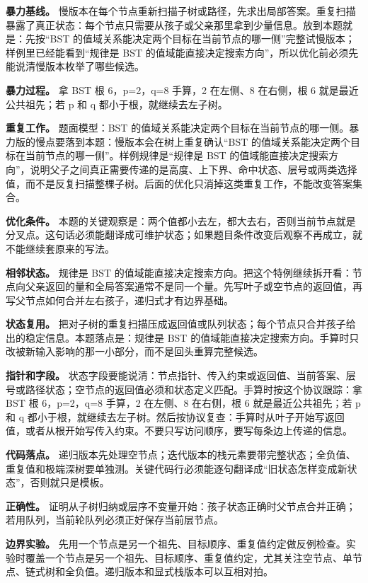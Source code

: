 \textbf{暴力基线。} 慢版本在每个节点重新扫描子树或路径，先求出局部答案。重复扫描暴露了真正状态：每个节点只需要从孩子或父亲那里拿到少量信息。放到本题就是：先按“BST 的值域关系能决定两个目标在当前节点的哪一侧”完整试慢版本；样例里已经能看到“规律是 BST 的值域能直接决定搜索方向”，所以优化前必须先能说清慢版本枚举了哪些候选。

\textbf{暴力过程。} 拿 BST 根 6，p=2，q=8 手算，2 在左侧、8 在右侧，根 6 就是最近公共祖先；若 p 和 q 都小于根，就继续去左子树。

\textbf{重复工作。} 题面模型：BST 的值域关系能决定两个目标在当前节点的哪一侧。暴力版的慢点要落到本题：慢版本会在树上重复确认“BST 的值域关系能决定两个目标在当前节点的哪一侧”。样例规律是“规律是 BST 的值域能直接决定搜索方向”，说明父子之间真正需要传递的是高度、上下界、命中状态、层号或两类选择值，而不是反复扫描整棵子树。后面的优化只消掉这类重复工作，不能改变答案集合。

\textbf{优化条件。} 本题的关键观察是：两个值都小去左，都大去右，否则当前节点就是分叉点。这句话必须能翻译成可维护状态；如果题目条件改变后观察不再成立，就不能继续套原来的写法。

\textbf{相邻状态。} 规律是 BST 的值域能直接决定搜索方向。把这个特例继续拆开看：节点向父亲返回的量和全局答案通常不是同一个量。先写叶子或空节点的返回值，再写父节点如何合并左右孩子，递归式才有边界基础。

\textbf{状态复用。} 把对子树的重复扫描压成返回值或队列状态；每个节点只合并孩子给出的稳定信息。本题落点是：规律是 BST 的值域能直接决定搜索方向。手算时只改被新输入影响的那一小部分，而不是回头重算完整候选。

\textbf{指针和字段。} 状态字段要能说清：节点指针、传入约束或返回值、当前答案、层号或路径状态；空节点的返回值必须和状态定义匹配。手算时按这个协议跟踪：拿 BST 根 6，p=2，q=8 手算，2 在左侧、8 在右侧，根 6 就是最近公共祖先；若 p 和 q 都小于根，就继续去左子树。然后按协议复查：手算时从叶子开始写返回值，或者从根开始写传入约束。不要只写访问顺序，要写每条边上传递的信息。

\textbf{代码落点。} 递归版本先处理空节点；迭代版本的栈元素要带完整状态；全负值、重复值和极端深树要单独测。关键代码行必须能逐句翻译成“旧状态怎样变成新状态”，否则就只是模板。

\textbf{正确性。} 证明从子树归纳或层序不变量开始：孩子状态正确时父节点合并正确；若用队列，当前轮队列必须正好保存当前层节点。

\textbf{边界实验。} 先用一个节点是另一个祖先、目标顺序、重复值约定做反例检查。实验时覆盖一个节点是另一个祖先、目标顺序、重复值约定，尤其关注空节点、单节点、链式树和全负值。递归版本和显式栈版本可以互相对拍。

